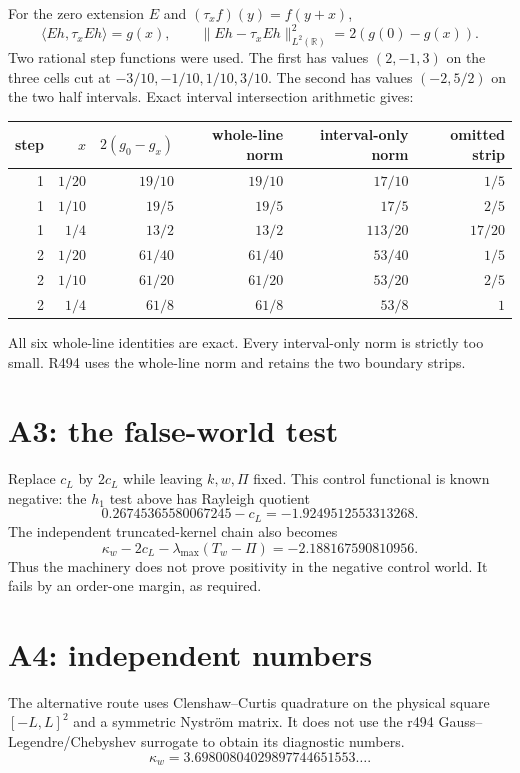 \documentclass[11pt]{article}
\theoremstyle{remark}
\begin{document}
For the zero extension $E$ and
$(\tau_xf)(y)=f(y+x)$,
\[
 \langle Eh,\tau_xEh\rangle=g(x),\qquad
 \|Eh-\tau_xEh\|_{L^2(\mathbb R)}^2=2(g(0)-g(x)).
\]
Two rational step functions were used.  The first has values
$(2,-1,3)$ on the three cells cut at
$-3/10,-1/10,1/10,3/10$.  The second has values $(-2,5/2)$ on the
two half intervals.  Exact interval intersection arithmetic gives:

\begin{center}
\small
\begin{tabular}{@{}rrrrrr@{}}
\toprule
step & $x$ & $2(g_0-g_x)$ & whole-line norm
& interval-only norm & omitted strip\\
\midrule
1&$1/20$&$19/10$&$19/10$&$17/10$&$1/5$\\
1&$1/10$&$19/5$ &$19/5$ &$17/5$ &$2/5$\\
1&$1/4$ &$13/2$ &$13/2$ &$113/20$&$17/20$\\
2&$1/20$&$61/40$&$61/40$&$53/40$&$1/5$\\
2&$1/10$&$61/20$&$61/20$&$53/20$&$2/5$\\
2&$1/4$ &$61/8$ &$61/8$ &$53/8$ &$1$\\
\bottomrule
\end{tabular}
\end{center}
All six whole-line identities are exact.  Every interval-only norm is
strictly too small.  R494 uses the whole-line norm and retains the two
boundary strips.

\section{A3: the false-world test}

Replace $c_L$ by $2c_L$ while leaving $k,w,\Pi$ fixed.  This control
functional is known negative: the $h_1$ test above has Rayleigh
quotient
\[
 0.26745365580067245-c_L=-1.9249512553313268.
\]
The independent truncated-kernel chain also becomes
\[
 \kappa_w-2c_L-\lambda_{\max}(T_w-\Pi)
 =-2.188167590810956.
\]
Thus the machinery does not prove positivity in the negative control
world.  It fails by an order-one margin, as required.

\section{A4: independent numbers}

The alternative route uses Clenshaw--Curtis quadrature on the physical
square $[-L,L]^2$ and a symmetric Nystr\"om matrix.  It does not use
the r494 Gauss--Legendre/Chebyshev surrogate to obtain its diagnostic
numbers.
\[
 \kappa_w=3.69800804029897744651553\ldots .
\]
\end{document}
